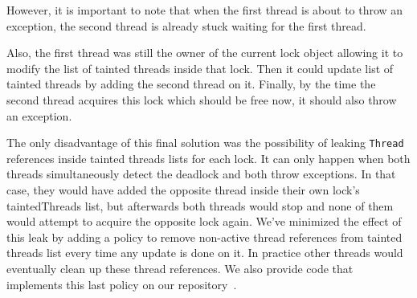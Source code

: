 However, it is important to note that when the first thread is about to throw an exception,
the second thread is already stuck waiting for the first thread.

Also, the first thread was still the owner of the current lock object allowing it to modify the list of tainted threads inside that lock.
Then it could update list of tainted threads by adding the second thread on it.
Finally, by the time the second thread acquires this lock which should be free now, it should also throw an exception.

The only disadvantage of this final solution was the possibility of leaking {\tt Thread} references inside tainted threads lists for each lock.
It can only happen when both threads simultaneously detect the deadlock and both throw exceptions.
In that case, they would have added the opposite thread inside their own lock's taintedThreads list, but afterwards
both threads would stop and none of them would attempt to acquire the opposite lock again.
We've minimized the effect of this leak by adding a policy to remove non-active thread
references from tainted threads list every time any update is done on it.
In practice other threads would eventually clean up these thread references.
We also provide code that implements this last policy on our repository~\cite{repo}.
